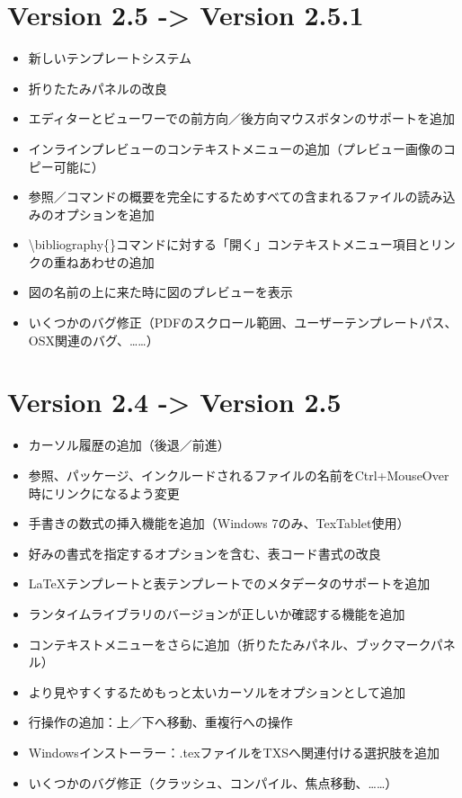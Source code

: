\documentclass[]{book}
\begin{document}
\section{Version 2.5 -\textgreater{} Version 2.5.1}

\begin{itemize}
\item
  新しいテンプレートシステム
\item
  折りたたみパネルの改良
\item
  エディターとビューワーでの前方向／後方向マウスボタンのサポートを追加
\item
  インラインプレビューのコンテキストメニューの追加（プレビュー画像のコピー可能に）
\item
  参照／コマンドの概要を完全にするためすべての含まれるファイルの読み込みのオプションを追加
\item
  \textbackslash{}bibliography\{\}コマンドに対する「開く」コンテキストメニュー項目とリンクの重ねあわせの追加
\item
  図の名前の上に来た時に図のプレビューを表示
\item
  いくつかのバグ修正（PDFのスクロール範囲、ユーザーテンプレートパス、OSX関連のバグ、\ldots{}\ldots{}）
\end{itemize}

\section{Version 2.4 -\textgreater{} Version 2.5}

\begin{itemize}
\item
  カーソル履歴の追加（後退／前進）
\item
  参照、パッケージ、インクルードされるファイルの名前をCtrl+MouseOver時にリンクになるよう変更
\item
  手書きの数式の挿入機能を追加（Windows 7のみ、TexTablet使用）
\item
  好みの書式を指定するオプションを含む、表コード書式の改良
\item
  LaTeXテンプレートと表テンプレートでのメタデータのサポートを追加
\item
  ランタイムライブラリのバージョンが正しいか確認する機能を追加
\item
  コンテキストメニューをさらに追加（折りたたみパネル、ブックマークパネル）
\item
  より見やすくするためもっと太いカーソルをオプションとして追加
\item
  行操作の追加：上／下へ移動、重複行への操作
\item
  Windowsインストーラー：.texファイルをTXSへ関連付ける選択肢を追加
\item
  いくつかのバグ修正（クラッシュ、コンパイル、焦点移動、\ldots{}\ldots{}）
\end{itemize}
\end{document}
